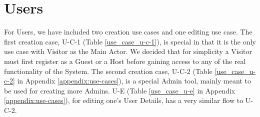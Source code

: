 \vspace{-0.7cm}
\section{Users}
\label{use-cases-users}

For Users, we have included two creation use cases and one editing use case. The first creation case, U-C-1 (Table \ref{use_case_u-c-1}), is special in that it is the only use case with Visitor as the Main Actor. We decided that for simplicity a Visitor must first register as a Guest or a Host before gaining access to any of the real functionality of the System. The second creation case, U-C-2 (Table \ref{use_case_u-c-2} in Appendix \ref{appendix:use-cases}), is a special Admin tool, mainly meant to be used for creating more Admins. U-E (Table \ref{use_case_u-e} in Appendix \ref{appendix:use-cases}), for editing one's User Details, has a very similar flow to U-C-2. 

